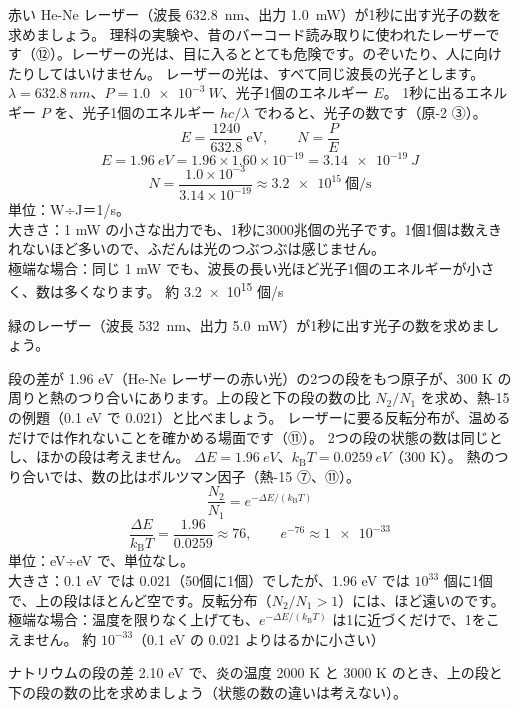 \label{ph:原-4:ex10}
\begin{phreidai}[He-Ne レーザーの光子の数]
赤い He-Ne レーザー（波長 \qty{632.8}{nm}、出力 \qty{1.0}{mW}）が1秒に出す光子の数を求めましょう。
\phbamen
理科の実験や、昔のバーコード読み取りに使われたレーザーです（⑫）。レーザーの光は、目に入るととても危険です。のぞいたり、人に向けたりしてはいけません。
\phmushi
レーザーの光は、すべて同じ波長の光子とします。
\phzu
$\lambda=\qty{632.8}{nm}$、$P=\qty{1.0e-3}{W}$、光子1個のエネルギー $E$。
\phriyu
1秒に出るエネルギー $P$ を、光子1個のエネルギー $hc/\lambda$ でわると、光子の数です（原-2 ③）。
\phtateru
\[ E=\frac{1240}{632.8}\ \mathrm{eV},\qquad N=\frac{P}{E} \]
\phtoku
\[ E=\qty{1.96}{eV}=1.96\times1.60\times10^{-19}=\qty{3.14e-19}{J} \]
\[ N=\frac{1.0\times10^{-3}}{3.14\times10^{-19}}\approx\num{3.2e15}\ \text{個/s} \]
\phtashikame
単位：W÷J＝1/s。\\
大きさ：1 mW の小さな出力でも、1秒に3000兆個の光子です。1個1個は数えきれないほど多いので、ふだんは光のつぶつぶは感じません。\\
極端な場合：同じ 1 mW でも、波長の長い光ほど光子1個のエネルギーが小さく、数は多くなります。
\kotae 約 \num{3.2e15} 個/s
\end{phreidai}
\begin{jibun}
緑のレーザー（波長 \qty{532}{nm}、出力 \qty{5.0}{mW}）が1秒に出す光子の数を求めましょう。
\end{jibun}

\label{ph:原-4:ex11}
\begin{phreidai}
段の差が 1.96 eV（He-Ne レーザーの赤い光）の2つの段をもつ原子が、300 K の周りと熱のつり合いにあります。上の段と下の段の数の比 $N_2/N_1$ を求め、熱-15 の例題（0.1 eV で 0.021）と比べましょう。
\phbamen
レーザーに要る反転分布が、温めるだけでは作れないことを確かめる場面です（⑪）。
\phmushi
2つの段の状態の数は同じとし、ほかの段は考えません。
\phzu
$\Delta E=\qty{1.96}{eV}$、$k_{\mathrm B}T=\qty{0.0259}{eV}$（300 K）。
\phriyu
熱のつり合いでは、数の比はボルツマン因子（熱-15 ⑦、⑪）。
\phtateru
\[ \frac{N_2}{N_1}=e^{-\Delta E/(k_{\mathrm B}T)} \]
\phtoku
\[ \frac{\Delta E}{k_{\mathrm B}T}=\frac{1.96}{0.0259}\approx76,\qquad e^{-76}\approx\num{1e-33} \]
\phtashikame
単位：eV÷eV で、単位なし。\\
大きさ：0.1 eV では 0.021（50個に1個）でしたが、1.96 eV では $10^{33}$ 個に1個で、上の段はほとんど空です。反転分布（$N_2/N_1>1$）には、ほど遠いのです。\\
極端な場合：温度を限りなく上げても、$e^{-\Delta E/(k_{\mathrm B}T)}$ は1に近づくだけで、1をこえません。
\kotae 約 $10^{-33}$（0.1 eV の 0.021 よりはるかに小さい）
\end{phreidai}
\begin{jibun}
ナトリウムの段の差 2.10 eV で、炎の温度 2000 K と 3000 K のとき、上の段と下の段の数の比を求めましょう（状態の数の違いは考えない）。
\end{jibun}

